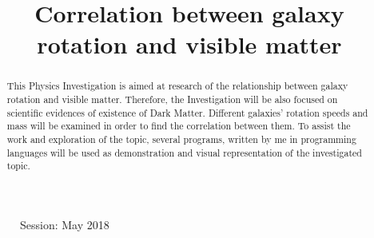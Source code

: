 \documentclass[a4paper, 12pt]{article}
\title{Correlation between galaxy rotation and visible matter}
\date{}
\author{}
\begin{document}
\maketitle

\begin{figure}
  \begin{flushleft}
    Session: May 2018\\
    \end{flushleft}
  \end{figure}

\newpage
{}
\begin{abstract}
  This Physics Investigation is aimed at research of the relationship between galaxy rotation and visible matter. Therefore, the Investigation will be also focused on scientific evidences of existence of Dark Matter. Different galaxies' rotation speeds and mass will be examined in order to find the correlation between them. To assist the work and exploration of the topic, several programs, written by me in programming languages will be used as demonstration and visual representation of the investigated topic.
  \end{abstract}

  
\end{document}

